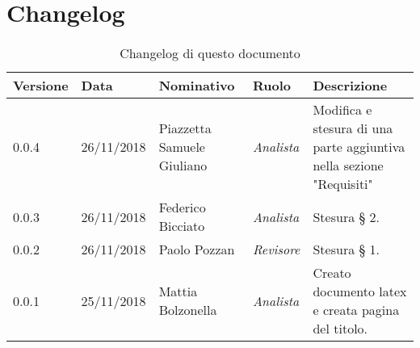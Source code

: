 \section*{Changelog}
\begin{table}[tbph]
        \centering
        \begin{tabularx}{\textwidth}{|l|l|l|l|X|}
                \hline
                \textbf{Versione} & \textbf{Data} & \textbf{Nominativo}  & \textbf{Ruolo} & 
                \textbf{Descrizione}\\
                \hline 
                
                \hline
                0.0.4 & 26/11/2018 & Piazzetta Samuele Giuliano & \textit{Analista}
                & Modifica e stesura di una parte aggiuntiva nella sezione "Requisiti"\\
                
                \hline
                0.0.3 & 26/11/2018 & Federico Bicciato & \textit{Analista}
                & Stesura § 2.\\
                
                \hline
                0.0.2 & 26/11/2018 &  Paolo Pozzan & \textit{Revisore}
                & Stesura § 1.\\

                \hline
                0.0.1 & 25/11/2018 & Mattia Bolzonella & \textit{Analista}
                & Creato documento latex e creata pagina del titolo.\\
                
                \hline
                
        \end{tabularx}
        \caption{Changelog di questo documento}
\end{table}